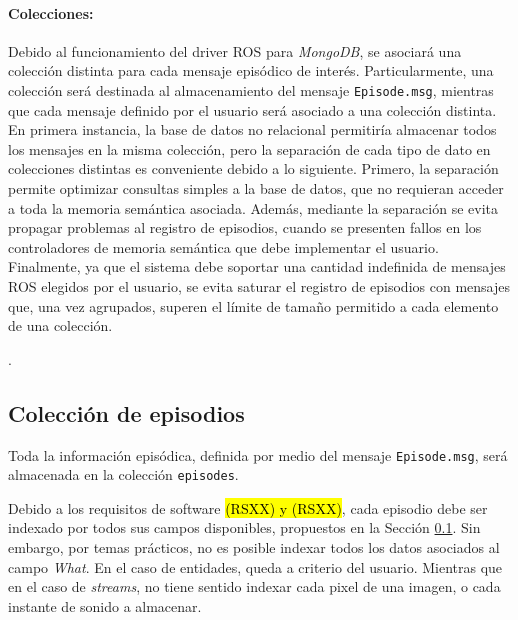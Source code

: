 \paragraph{Colecciones:}
Debido al funcionamiento del driver ROS para \textit{MongoDB}, se asociará una colección distinta para cada mensaje episódico de interés. Particularmente, una colección será destinada al almacenamiento del mensaje \texttt{Episode.msg}, mientras que cada mensaje definido por el usuario será  asociado a una colección distinta. En primera instancia, la base de datos no relacional permitiría almacenar todos los mensajes en la misma colección, pero la separación de cada tipo de dato en colecciones distintas es conveniente debido a lo siguiente. Primero, la separación permite optimizar consultas simples a la base de datos, que no requieran acceder a toda la memoria semántica asociada. Además, mediante la separación se evita propagar problemas al registro de episodios, cuando se presenten fallos en los controladores de memoria semántica que debe implementar el usuario. Finalmente, ya que el sistema debe soportar una cantidad indefinida de mensajes ROS elegidos por el usuario, se evita saturar el registro de episodios con mensajes que, una vez agrupados, superen el límite de tamaño permitido a cada elemento de una colección.

.


\subsection{Colección de episodios}

Toda la información episódica, definida por medio del mensaje \texttt{Episode.msg}, será almacenada en la colección \texttt{episodes}.

Debido a los requisitos de software \hl{(RSXX) y (RSXX)}, cada episodio debe ser indexado por todos sus campos disponibles, propuestos en la Sección \ref{}. Sin embargo, por temas prácticos, no es posible indexar todos los datos asociados al campo \textit{What}. En el caso de entidades, queda a criterio del usuario. Mientras que en el caso de \textit{streams}, no tiene sentido indexar cada pixel de una imagen, o cada instante de sonido a almacenar.





